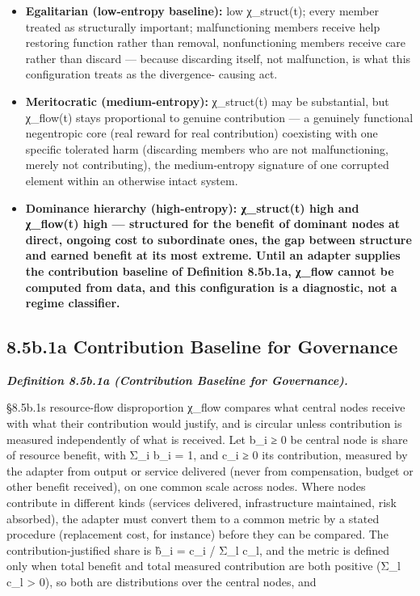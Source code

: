 \documentclass[
]{article}
\begin{document}
\begin{itemize}
\item
  \textbf{Egalitarian (low-entropy baseline):} low χ\_struct(t); every
  member treated as structurally important; malfunctioning members
  receive help restoring function rather than removal, nonfunctioning
  members receive care rather than discard --- because discarding
  itself, not malfunction, is what this configuration treats as the
  divergence- causing act.
\item
  \textbf{Meritocratic (medium-entropy):} χ\_struct(t) may be
  substantial, but χ\_flow(t) stays proportional to genuine contribution
  --- a genuinely functional negentropic core (real reward for real
  contribution) coexisting with one specific tolerated harm (discarding
  members who are not malfunctioning, merely not contributing), the
  medium-entropy signature of one corrupted element within an otherwise
  intact system.
\item
  \textbf{Dominance hierarchy (high-entropy): χ\_struct(t) high and
  χ\_flow(t) high --- structured for the benefit of dominant nodes at
  direct, ongoing cost to subordinate ones, the gap between structure
  and earned benefit at its most extreme. Until an adapter supplies the
  contribution baseline of Definition 8.5b.1a, χ\_flow cannot be
  computed from data, and this configuration is a diagnostic, not a
  regime classifier.}
\end{itemize}

\hypertarget{b.1a-contribution-baseline-for-governance}{%
\subsection{8.5b.1a Contribution Baseline for
Governance}\label{b.1a-contribution-baseline-for-governance}}

\emph{\textbf{Definition 8.5b.1a (Contribution Baseline for
Governance).}}

§8.5b.1\textquotesingle s resource-flow disproportion χ\_flow compares
what central nodes receive with what their contribution would justify,
and is circular unless contribution is measured independently of what is
received. Let b\_i ≥ 0 be central node i\textquotesingle s share of
resource benefit, with Σ\_i b\_i = 1, and c\_i ≥ 0 its contribution,
measured by the adapter from output or service delivered (never from
compensation, budget or other benefit received), on one common scale
across nodes. Where nodes contribute in different kinds (services
delivered, infrastructure maintained, risk absorbed), the adapter must
convert them to a common metric by a stated procedure (replacement cost,
for instance) before they can be compared. The contribution-justified
share is b̂\_i = c\_i / Σ\_l c\_l, and the metric is defined only when
total benefit and total measured contribution are both positive (Σ\_l
c\_l \textgreater{} 0), so both are distributions over the central
nodes, and
\end{document}

